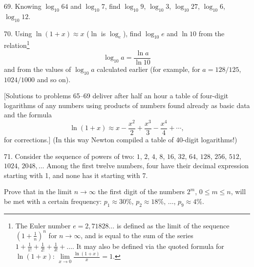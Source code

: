 \begin{problem}{69.}
	Knowing $\log_{10} 64$ and $\log_{10} 7$, find $\log_{10} 9$, $\log_{10} 3$,
    $\log_{10} 27$, $\log_{10} 6$, $\log_{10} 12$.
\end{problem}

\begin{problem}{70.}
	Using $\ln (1+x) \approx x$ ($\ln$ is $\log_e$), find $\log_{10} e$ and
    $\ln 10$ from the relation\footnote{The Euler number $e = 2{,}71828\dots$ is defined as the limit of the sequence
	$\left(1+\frac1n\right)^n$ for $n\to \infty$, and is equal to the sum of the series 
	$1+\frac 1{1!} +\frac 1{2!}+\frac 1{3!}+\dots$. It may also be defined via the quoted formula for 
	 $\ln (1+x)$: $\lim\limits_{x\to 0}\frac{\ln(1+x)}{x} = 1$.}
	\begin{equation*}
		\log_{10} a=\frac{\ln a}{\ln 10}
	\end{equation*} 
	and from the values of $\log_{10} a$ calculated earlier (for example, for $a=128/125$, $1024/1000$
	and so on).

	[Solutions to problems 65--69 deliver after half an hour a table of four-digit logarithms of any numbers using
	products of numbers found already as basic data and the formula  
	\begin{equation*}
		\ln (1+x) \approx x-\frac{x^2}{2}+\frac{x^3}{3}-\frac{x^4}{4}+\dotsb,
	\end{equation*}
	for corrections.] (In this way Newton compiled a table of
	40-digit logarithms!)
\end{problem}

\begin{problem}{71.}
	Consider the sequence of powers of two: $1$, $2$, $4$, $8$, $16$, $32$, $64$,
	$128$, $256$, $512$, $1024$, $2048, \dotsc$ Among the first twelve numbers, four have their decimal expression
	starting with 1, and none has it starting with 7.

	Prove that in the limit $n \to \infty$ the first digit of the numbers $2^m$,
	$0\leqslant m \leqslant n$, will be met with a certain frequency:
	$p_1 \approx 30\%$, $p_2 \approx 18\%$,  $\dots$, $p_9 \approx 4\%$.
\end{problem}

